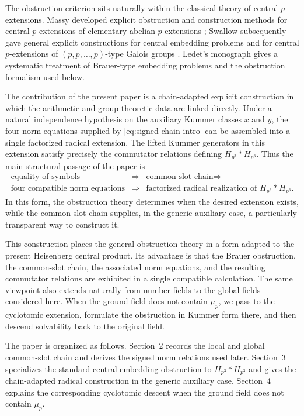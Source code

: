 \documentclass[12pt]{amsart}
\theoremstyle{definition}
\theoremstyle{remark}
\newcommand{\Hp}{H_{p^3}}
\begin{document}
The obstruction criterion sits naturally within the classical theory of
central $p$-extensions. Massy developed explicit obstruction and construction
methods for central $p$-extensions of elementary abelian $p$-extensions
\cite{Massy}; Swallow subsequently gave general explicit constructions for
central embedding problems and for central $p$-extensions of
$(p,p,\ldots,p)$-type Galois groups
\cite{SwallowConstructible,SwallowCentral}. Ledet's monograph
\cite{Ledet} gives a systematic treatment of Brauer-type embedding problems
and the obstruction formalism used below.

The contribution of the present paper is a chain-adapted explicit
construction in which the arithmetic and group-theoretic data are linked
directly. Under a natural independence
hypothesis on the auxiliary Kummer classes $x$ and $y$, the four norm
equations supplied by \eqref{eq:signed-chain-intro} can be assembled into a
single factorized radical extension. The lifted Kummer generators in this
extension satisfy precisely the commutator relations defining $\Hp*\Hp$.
Thus the main structural passage of the paper is
\begin{eqnarray*}
	\text{equality of symbols}
	&\Longrightarrow&
	\text{common-slot chain}
	\Longrightarrow\\
	\text{four compatible norm equations}
	&\Longrightarrow&
	\text{factorized radical realization of }\Hp*\Hp.
\end{eqnarray*}
In this form, the obstruction theory determines when the desired extension
exists, while the common-slot chain supplies, in the generic auxiliary case,
a particularly transparent way to construct it.

This construction places the general obstruction theory in a form adapted
to the present Heisenberg central product. Its advantage is that the Brauer
obstruction, the common-slot chain, the associated norm equations, and the
resulting commutator relations are exhibited in a single compatible
calculation. The same viewpoint also extends naturally
from number fields to the global fields considered here. When the ground
field does not contain $\mu_p$, we pass to the cyclotomic extension, formulate
the obstruction in Kummer form there, and then descend solvability back to
the original field.

The paper is organized as follows. Section~2 records the local and global
common-slot chain and derives the signed norm relations used later.
Section~3 specializes the standard central-embedding obstruction to
$\Hp*\Hp$ and gives the chain-adapted radical construction in the generic
auxiliary case. Section~4 explains the corresponding cyclotomic descent when
the ground field does not contain $\mu_p$.
\end{document}
